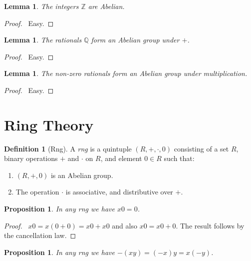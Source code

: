 \documentclass{article}
\let\qed\relax
\newtheorem{lemma}[axiom]{Lemma}
\newtheorem{proposition}[axiom]{Proposition}
\theoremstyle{definition}
\newtheorem{definition}[axiom]{Definition}
\begin{document}
    \begin{lemma}
        The integers $\mathbb{Z}$ are Abelian.
    \end{lemma}

    \begin{proof}
        \pf\ Easy. \qed
    \end{proof}

    \begin{lemma}
        The rationals $\mathbb{Q}$ form an Abelian group under $+$.
    \end{lemma}

    \begin{proof}
        \pf\ Easy.
    \end{proof}

    \begin{lemma}
        The non-zero rationals form an Abelian group under multiplication.
    \end{lemma}

    \begin{proof}
        \pf\ Easy. \qed
    \end{proof}

    \section{Ring Theory}

    \begin{definition}[Rng]
        A \emph{rng} is a quintuple $(R, +, \cdot, 0)$ consisting of a set $R$,
        binary operations $+$ and $\cdot$ on $R$, and element $0 \in R$ such that:
        \begin{enumerate}
            \item $(R, +, 0)$ is an Abelian group.
            \item The operation $\cdot$ is associative, and distributive over $+$.
        \end{enumerate}
    \end{definition}

    \begin{proposition}
        In any rng we have $x0 = 0$.
    \end{proposition}

    \begin{proof}
        \pf\ $x0 = x(0+0) = x0+x0$ and also $x0 = x0+0$.
        The result follows by the cancellation law. \qed
    \end{proof}

    \begin{proposition}
        In any rng we have $-(xy) = (-x)y = x(-y)$.
    \end{proposition}
\end{document}
